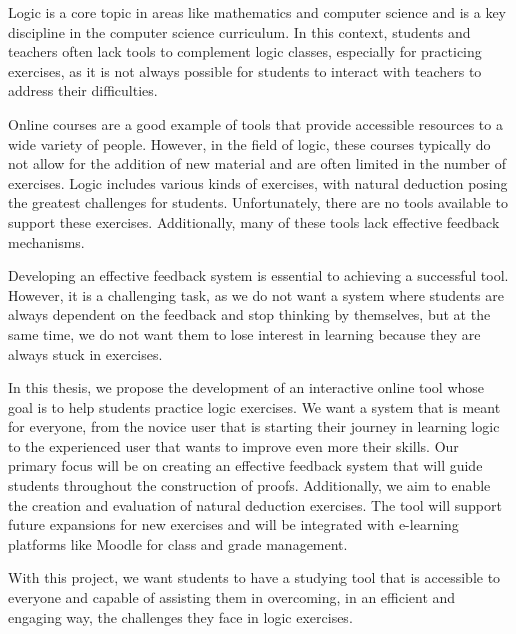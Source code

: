 
%

Logic is a core topic in areas like mathematics and computer science and is a key discipline in the computer science curriculum. In this context, students and teachers often lack tools to complement logic classes, especially for practicing exercises, as it is not always possible for students to interact with teachers to address their difficulties.

Online courses are a good example of tools that provide accessible resources to a wide variety of people. However, in the field of logic, these courses typically do not allow for the addition of new material and are often limited in the number of exercises. Logic includes various kinds of exercises, with natural deduction posing the greatest challenges for students. Unfortunately, there are no tools available to support these exercises. Additionally, many of these tools lack effective feedback mechanisms.

Developing an effective feedback system is essential to achieving a successful tool. However, it is a challenging task, as we do not want a system where students are always dependent on the feedback and stop thinking by themselves, but at the same time, we do not want them to lose interest in learning because they are always stuck in exercises.

In this thesis, we propose the development of an interactive online tool whose goal is to help students practice logic exercises. We want a system that is meant for everyone, from the novice user that is starting their journey in learning logic to the experienced user that wants to improve even more their skills. Our primary focus will be on creating an effective feedback system that will guide students throughout the construction of proofs. Additionally, we aim to enable the creation and evaluation of natural deduction exercises. The tool will support future expansions for new exercises and will be integrated with e-learning platforms like Moodle for class and grade management.

With this project, we want students to have a studying tool that is accessible to everyone and capable of assisting them in overcoming, in an efficient and engaging way, the challenges they face in logic exercises.
 
